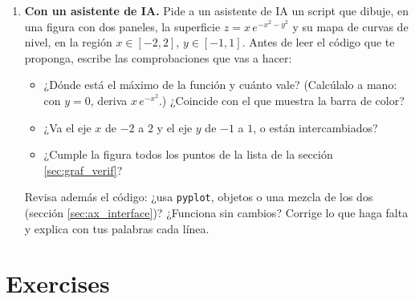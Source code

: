 \begin{enumerate}
\item \textbf{Con un asistente de IA.} Pide a un asistente de IA un script que dibuje, en una figura con dos paneles, la superficie $z=x\,e^{-x^2-y^2}$ y su mapa de curvas de nivel, en la región $x\in[-2,2]$, $y\in[-1,1]$. Antes de leer el código que te proponga, escribe las comprobaciones que vas a hacer:
\begin{itemize}
\item ¿Dónde está el máximo de la función y cuánto vale? (Calcúlalo a mano: con $y=0$, deriva $x\,e^{-x^2}$.) ¿Coincide con el que muestra la barra de color?
\item ¿Va el eje $x$ de $-2$ a $2$ y el eje $y$ de $-1$ a $1$, o están intercambiados?
\item ¿Cumple la figura todos los puntos de la lista de la sección \ref{sec:graf_verif}?
\end{itemize}
Revisa además el código: ¿usa \texttt{pyplot}, objetos o una mezcla de los dos (sección \ref{sec:ax_interface})? ¿Funciona sin cambios? Corrige lo que haga falta y explica con tus palabras cada línea.
\end{enumerate}

\newpage
\section{Exercises}

